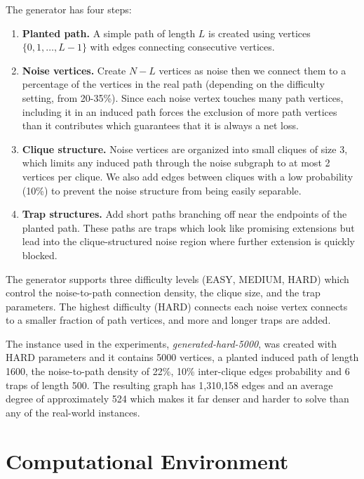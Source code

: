 The generator has four steps:

\begin{enumerate}
    \item \textbf{Planted path.} A simple path of length $L$ is created using vertices $\{0, 1, \ldots, L-1\}$ with edges connecting consecutive vertices.

    \item \textbf{Noise vertices.} Create $N - L$ vertices as noise then we connect them to a percentage of the vertices in the real path (depending on the difficulty setting, from 20-35\%). Since each noise vertex touches many path vertices, including it in an induced path forces the exclusion of more path vertices than it contributes which guarantees that it is always a net loss.

    \item \textbf{Clique structure.} Noise vertices are organized into small cliques of size 3, which limits any induced path through the noise subgraph to at most 2 vertices per clique. We also add edges between cliques with a low probability (10\%) to prevent the noise structure from being easily separable.

    \item \textbf{Trap structures.} Add short paths branching off near the endpoints of the planted path. These paths are traps which look like promising extensions but lead into the clique-structured noise region where further extension is quickly blocked.
\end{enumerate}

The generator supports three difficulty levels (EASY, MEDIUM, HARD) which control the noise-to-path connection density, the clique size, and the trap parameters. The highest difficulty (HARD) connects each noise vertex connects to a smaller fraction of path vertices, and more and longer traps are added.

The instance used in the experiments, \textit{generated-hard-5000}, was created with HARD parameters and it contains 5000 vertices, a planted induced path of length 1600, the noise-to-path density of 22\%, 10\% inter-clique edges probability and 6 traps of length 500. The resulting graph has 1,310,158 edges and an average degree of approximately 524 which makes it far denser and harder to solve than any of the real-world instances.


\section{Computational Environment}\label{sec:environment}

